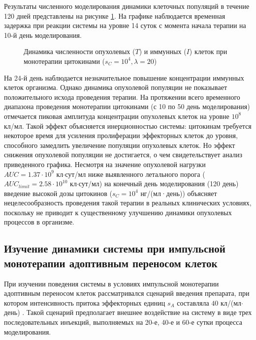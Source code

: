 Результаты численного моделирования динамики клеточных популяций в течение 120
дней представлены на рисунке \ref{fig:monotherapy}. На графике наблюдается
временная задержка при реакции системы на уровне 14 суток с момента начала терапии на 10-й
день моделирования.

\begin{figure}[ht!]
  \centering
  
  \caption{Динамика численности опухолевых ($T$) и иммунных ($I$) клеток при
  монотерапии цитокинами ($s_C = 10^4, \lambda = 20$)}
  \label{fig:monotherapy}
\end{figure}

На 24-й день наблюдается незначительное повышение
концентрации иммунных клеток организма. Однако динамика опухолевой популяции не
показывает положительного исхода проведения терапии. На протяжении всего
временного диапазона проведения монотерапии цитокинами (с 10 по 50 день моделирования)
отмечается пиковая амплитуда концентрации опухолевых клеток на уровне $10^8$ кл/мл.
Такой эффект объясняется инерционностью системы: цитокинам
требуется некоторое время для усиления пролиферации эффекторных клеток до
уровня, способного замедлить увеличение популяции опухолевых клеток.
Но эффект снижения опухолевой популяции не достигается, о чем свидетельствует
анализ приведенного графика. Несмотря на значение опухолевой нагрузки
$AUC = 1.37 \cdot 10^9$ кл$\cdot$сут/мл ниже выявленного летального порога
($AUC_{limit} = 2.58 \cdot 10^{10}$ кл$\cdot$сут/мл) на конечный день
моделирования (120 день) введение высокой дозы
цитокинов ($s_C = 10^4$ нг/(мл·день)) объясняет нецелесообразность проведения
такой терапии в реальных клинических условиях, поскольку не приводит к
существенному улучшению динамики опухолевых процессов в организме.

\subsection{Изучение динамики системы при импульсной монотерапии адоптивным
переносом клеток}

При изучении поведения системы в условиях импульсной монотерапии адоптивным
переносом клеток рассматривался сценарий введения препарата, при котором
интенсивность притока эффекторных единиц $s_A$ составляла $40$
кл/(мл$\cdot$день) \cite{adoptive_therapy}. Такой сценарий предполагает
внешнее воздействие на систему в виде трех последовательных инъекций,
выполняемых на 20-е, 40-е и 60-е сутки процесса моделирования.

